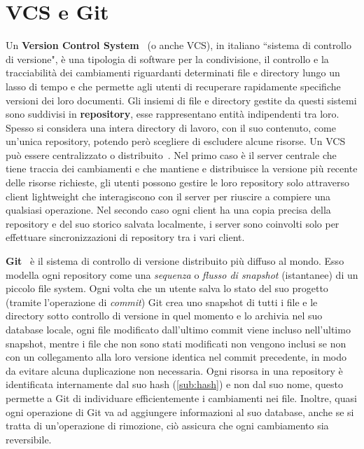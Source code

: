 \section{VCS e Git}
\label{sub:vcs}
Un \textbf{Version Control System}~\cite{vcs1} (o anche VCS), in italiano ``sistema di controllo di versione",
è una tipologia di software per la condivisione,
il controllo e la tracciabilità dei cambiamenti riguardanti determinati file e directory
lungo un lasso di tempo e che permette agli utenti di recuperare rapidamente specifiche
versioni dei loro documenti. Gli insiemi di file e directory gestite da questi sistemi
sono suddivisi in \textbf{repository}, esse rappresentano entità indipendenti tra loro.
Spesso si considera una intera directory di lavoro, con il suo contenuto,
come un'unica repository, potendo però scegliere di escludere alcune risorse.
Un VCS può essere centralizzato o distribuito~\cite{vcs2}.
Nel primo caso è il server centrale che tiene traccia dei cambiamenti e che mantiene e
distribuisce la versione più recente delle risorse richieste, gli utenti possono gestire
le loro repository solo attraverso client lightweight che interagiscono con il server
per riuscire a compiere una qualsiasi operazione.
Nel secondo caso ogni client ha una copia precisa della repository e del suo storico
salvata localmente, i server sono coinvolti solo per effettuare sincronizzazioni
di repository tra i vari client. 

\label{sub:git}
\textbf{Git}~\cite{git-21} è il sistema di controllo di versione distribuito più diffuso al mondo.
Esso modella ogni repository come una \emph{sequenza} o \emph{flusso di snapshot} (istantanee)
di un piccolo file system. Ogni volta che un utente salva lo stato del suo progetto
(tramite l'operazione di \emph{commit}) Git crea uno snapshot di tutti i file e le directory
sotto controllo di versione in quel momento e lo archivia nel suo database locale, ogni
file modificato dall'ultimo commit viene incluso nell'ultimo snapshot, mentre i file che
non sono stati modificati non vengono inclusi se non con un collegamento alla loro versione identica
nel commit precedente, in modo da evitare alcuna duplicazione non necessaria.
Ogni risorsa in una repository è identificata internamente dal suo hash (\autoref{sub:hash}) e non dal suo nome,
questo permette a Git di individuare efficientemente i cambiamenti nei file.
Inoltre, quasi ogni operazione di Git va ad aggiungere informazioni al suo database, anche se si tratta
di un'operazione di rimozione, ciò assicura che ogni cambiamento sia reversibile.


